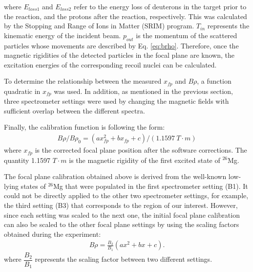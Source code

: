 where $E_{loss1}$ and $E_{loss2}$ refer to the energy loss of deuterons in the target prior to the reaction, and the protons after the reaction, respectively. This was calculated by the Stopping and Range of Ions in Matter (SRIM) program\citep{srim}. $T_{in}$ represents the kinematic energy of the incident beam. $p_{out}$ is the momentum of the scattered particles whose movements are described by Eq. \ref{eq:brho}. Therefore, once the magnetic rigidities of the detected particles in the focal plane are known, the excitation energies of the corresponding recoil nuclei can be calculated.

To determine the relationship between the measured $x_{fp}$ and $B\rho$, a function quadratic in $x_{fp}$ was used. In addition, as mentioned in the previous section,  three spectrometer  settings were used by changing the magnetic fields with sufficient overlap between the different spectra.

Finally, the calibration function is following the form:
\begin{equation}
    \label{eq:focal_plane_cali}
    \begin{aligned}
    B\rho /B\rho_0 = (ax_{fp}^2+bx_{fp}+c)/( 1.1597 \ T\cdot m)
    \end{aligned}
\end{equation}
where $x_{fp}$ is the corrected focal plane position after the software corrections. The quantity  1.1597 $T\cdot m$ is the magnetic rigidity of the first excited state of $^{26}$Mg.

The focal plane calibration obtained above is derived from the well-known low-lying states of $^{26}$Mg that were populated in the first spectrometer setting (B1). It could not be directly applied to the other two spectrometer  settings, for example, the third setting (B3) that corresponds to the region of our interest. However, since each setting was scaled to the next one, the initial focal plane calibration can also be scaled to the other focal plane settings by using the scaling factors obtained during the experiment:
\begin{equation}
    \label{eq:scaling}
    \begin{aligned}
    B\rho  =  \frac{B_2}{B_1}(ax_{}^2+bx_{}+c).
    \end{aligned}
\end{equation}
where $\dfrac{B_2}{B_1}$ represents the scaling factor between two different settings.




